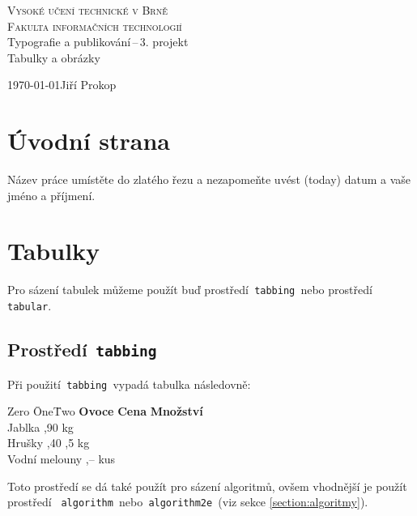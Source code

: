 \documentclass[a4paper, 11pt]{article}
\begin{document}
\begin{titlepage}
\begin{center}

\textsc{\Huge Vysoké učení technické v Brně \\}
\vspace{0.5 em}
\textsc{\huge Fakulta informačních technologií\\}
{\LARGE Typografie a publikování\,--\,3. projekt\\}
\vspace{0.4 em}
{\Huge Tabulky a obrázky \\}
\end{center}
{\Large \today \hfill Jiří Prokop}
\end{titlepage}


\setlength{\skip\footins}{0cm}
\section{Úvodní strana}
Název práce umístěte do zlatého řezu a nezapomeňte uvést  (today) datum a vaše jméno a příjmení.

\section{Tabulky}
Pro sázení tabulek můžeme použít buď prostředí\texttt{ tabbing }nebo prostředí\texttt{ tabular}.

\subsection{Prostředí\texttt{ tabbing}}
Při použití\texttt{ tabbing }vypadá tabulka následovně:
\begin{tabbing}
 Zero \qquad\qquad\quad\=One\qquad\=Two \kill
\textbf{Ovoce}      \> \textbf{Cena}    \> \textbf{Množství} \\
Jablka              ,90             kg \\
Hrušky              ,40            ,5 kg \\
Vodní melouny       ,--             kus \\
\end{tabbing}
Toto prostředí se dá také použít pro sázení algoritmů, ovšem vhodnější je použít prostředí
\texttt{ algorithm }nebo\texttt{ algorithm2e }(viz sekce \ref{section:algoritmy}).
\end{document}
